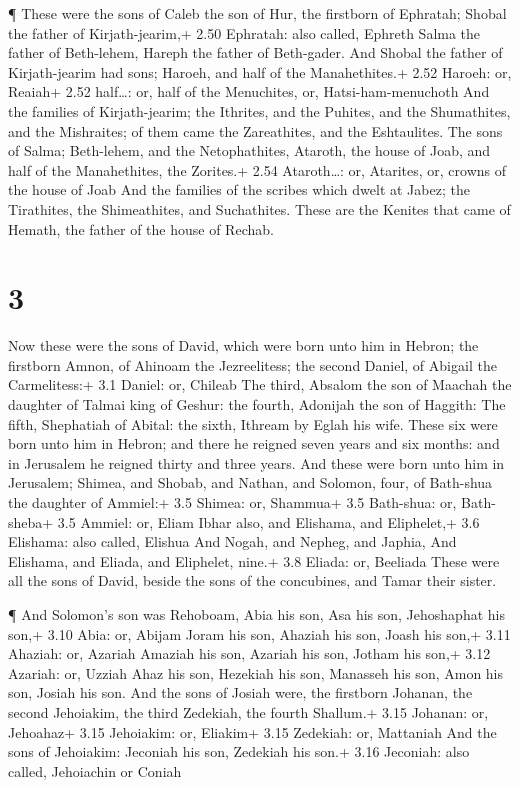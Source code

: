  ¶ These were the sons of Caleb the son of Hur, the
firstborn of Ephratah; Shobal the father of Kirjath-jearim,+ 2.50
Ephratah: also called, Ephreth  Salma the father of
Beth-lehem, Hareph the father of Beth-gader.  And Shobal
the father of Kirjath-jearim had sons; Haroeh, and half of the
Manahethites.+ 2.52 Haroeh: or, Reaiah+ 2.52 half\ldots: or, half of the
Menuchites, or, Hatsi-ham-menuchoth  And the families of
Kirjath-jearim; the Ithrites, and the Puhites, and the Shumathites, and
the Mishraites; of them came the Zareathites, and the Eshtaulites.
 The sons of Salma; Beth-lehem, and the Netophathites,
Ataroth, the house of Joab, and half of the Manahethites, the Zorites.+
2.54 Ataroth\ldots: or, Atarites, or, crowns of the house of Joab
 And the families of the scribes which dwelt at Jabez; the
Tirathites, the Shimeathites, and Suchathites. These are the Kenites
that came of Hemath, the father of the house of Rechab.

\hypertarget{section-2}{%
\section{3}\label{section-2}}

 Now these were the sons of David, which were born unto him
in Hebron; the firstborn Amnon, of Ahinoam the Jezreelitess; the second
Daniel, of Abigail the Carmelitess:+ 3.1 Daniel: or, Chileab
 The third, Absalom the son of Maachah the daughter of
Talmai king of Geshur: the fourth, Adonijah the son of Haggith:
 The fifth, Shephatiah of Abital: the sixth, Ithream by
Eglah his wife.  These six were born unto him in Hebron; and
there he reigned seven years and six months: and in Jerusalem he reigned
thirty and three years.  And these were born unto him in
Jerusalem; Shimea, and Shobab, and Nathan, and Solomon, four, of
Bath-shua the daughter of Ammiel:+ 3.5 Shimea: or, Shammua+ 3.5
Bath-shua: or, Bath-sheba+ 3.5 Ammiel: or, Eliam  Ibhar
also, and Elishama, and Eliphelet,+ 3.6 Elishama: also called, Elishua
 And Nogah, and Nepheg, and Japhia,  And
Elishama, and Eliada, and Eliphelet, nine.+ 3.8 Eliada: or, Beeliada
 These were all the sons of David, beside the sons of the
concubines, and Tamar their sister.

 ¶ And Solomon's son was Rehoboam, Abia his son, Asa his
son, Jehoshaphat his son,+ 3.10 Abia: or, Abijam  Joram his
son, Ahaziah his son, Joash his son,+ 3.11 Ahaziah: or, Azariah
 Amaziah his son, Azariah his son, Jotham his son,+ 3.12
Azariah: or, Uzziah  Ahaz his son, Hezekiah his son,
Manasseh his son,  Amon his son, Josiah his son.
 And the sons of Josiah were, the firstborn Johanan, the
second Jehoiakim, the third Zedekiah, the fourth Shallum.+ 3.15 Johanan:
or, Jehoahaz+ 3.15 Jehoiakim: or, Eliakim+ 3.15 Zedekiah: or, Mattaniah
 And the sons of Jehoiakim: Jeconiah his son, Zedekiah his
son.+ 3.16 Jeconiah: also called, Jehoiachin or Coniah

